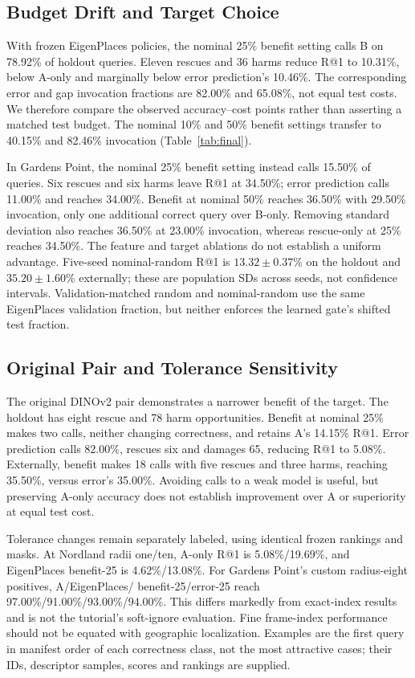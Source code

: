 \documentclass[conference]{IEEEtran}
\begin{document}
\subsection{Budget Drift and Target Choice}
With frozen EigenPlaces policies, the nominal 25\% benefit setting calls
B on 78.92\% of holdout queries. Eleven rescues and 36 harms reduce
R@1 to 10.31\%, below A-only and marginally below error prediction's
10.46\%. The corresponding error and gap invocation fractions are
82.00\% and 65.08\%, not equal test costs. We therefore compare the
observed accuracy--cost points rather than asserting a matched test budget.
The nominal 10\% and 50\% benefit settings transfer to 40.15\% and
82.46\% invocation (Table~\ref{tab:final}).

In Gardens Point, the nominal 25\% benefit setting instead calls 15.50\%
of queries. Six rescues and six harms leave R@1 at 34.50\%; error
prediction calls 11.00\% and reaches 34.00\%. Benefit at nominal 50\%
reaches 36.50\% with 29.50\% invocation, only one additional correct
query over B-only. Removing standard deviation also reaches 36.50\%
at 23.00\% invocation, whereas rescue-only at 25\% reaches 34.50\%.
The feature and target ablations do not establish a uniform advantage.
Five-seed nominal-random R@1 is $13.32\pm0.37$\% on the holdout and
$35.20\pm1.60$\% externally; these are population SDs across seeds,
not confidence intervals. Validation-matched random and nominal-random
use the same EigenPlaces validation fraction, but neither enforces the
learned gate's shifted test fraction.

\subsection{Original Pair and Tolerance Sensitivity}
The original DINOv2 pair demonstrates a narrower benefit of the target.
The holdout has eight rescue and 78 harm opportunities. Benefit at nominal
25\% makes two calls, neither changing correctness, and retains A's
14.15\% R@1. Error prediction calls 82.00\%, rescues six and damages
65, reducing R@1 to 5.08\%. Externally, benefit makes 18 calls with five
rescues and three harms, reaching 35.50\%, versus error's 35.00\%.
Avoiding calls to a weak model is useful, but preserving A-only accuracy
does not establish improvement over A or superiority at equal test cost.

Tolerance changes remain separately labeled, using identical frozen
rankings and masks. At Nordland radii one/ten, A-only R@1 is
5.08\%/19.69\%, and EigenPlaces benefit-25 is 4.62\%/13.08\%.
For Gardens Point's custom radius-eight positives, A/EigenPlaces/
benefit-25/error-25 reach 97.00\%/91.00\%/93.00\%/94.00\%.
This differs markedly from exact-index results and is not the tutorial's
soft-ignore evaluation. Fine frame-index performance should not be
equated with geographic localization. Examples are the first query in
manifest order of each correctness class, not the most attractive cases;
their IDs, descriptor samples, scores and rankings are supplied.
\end{document}
